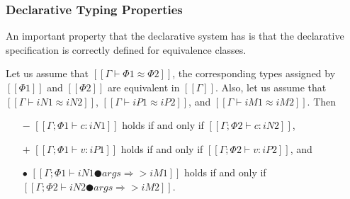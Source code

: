\subsubsection{Declarative Typing Properties}
  An important property that the declarative system has is
  that the declarative specification is correctly defined for
  equivalence classes.

\begin{property}
  Let us assume that $[[Γ ⊢ Φ1 ≈ Φ2]]$, \ie  
  the corresponding types assigned by $[[Φ1]]$ and
  $[[Φ2]]$ are equivalent in $[[Γ]]$.
  Also, let us assume that 
  $[[Γ ⊢ iN1 ≈ iN2]]$, $[[Γ ⊢ iP1 ≈ iP2]]$,
  and $[[Γ ⊢ iM1 ≈ iM2]]$. Then
  \begin{itemize}
    \item [$-$] $[[Γ ; Φ1 ⊢ c : iN1]]$ holds if and only if $[[Γ ; Φ2 ⊢ c : iN2]]$,
    \item [$+$] $[[Γ ; Φ1 ⊢ v : iP1]]$ holds if and only if $[[Γ ; Φ2 ⊢ v : iP2]]$, and
    \item [$\bullet$] $[[Γ; Φ1 ⊢ iN1 ● args ⇒> iM1]]$ holds if and only if $[[Γ; Φ2 ⊢ iN2 ● args ⇒> iM2]]$.
  \end{itemize}
\end{property}



